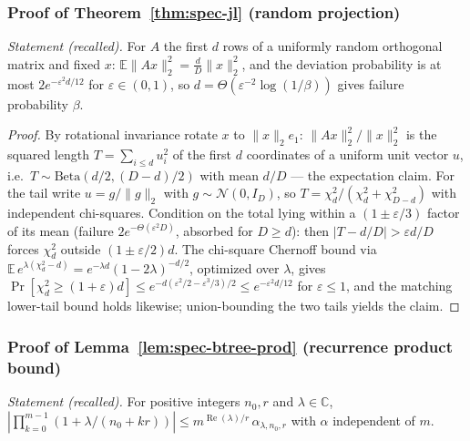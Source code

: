 \subsubsection*{Proof of Theorem~\ref{thm:spec-jl} (random projection)}
{\itshape Statement (recalled).} For $A$ the first $d$ rows of a uniformly
random orthogonal matrix and fixed $x$: $\mathbb{E}\|Ax\|_2^2 =
\frac{d}{D}\|x\|_2^2$, and the deviation probability is at most
$2e^{-\varepsilon^2 d/12}$ for $\varepsilon \in (0,1)$, so $d =
\Theta(\varepsilon^{-2}\log(1/\beta))$ gives failure probability
$\beta$.\eop

\begin{proof}
By rotational invariance rotate $x$ to $\|x\|_2 e_1$: $\|Ax\|_2^2/\|x\|_2^2$
is the squared length $T = \sum_{i \le d} u_i^2$ of the first $d$
coordinates of a uniform unit vector $u$, i.e.\ $T \sim \mathrm{Beta}(d/2,
(D-d)/2)$ with mean $d/D$ --- the expectation claim. For the tail write $u =
g/\|g\|_2$ with $g \sim \mathcal{N}(0, I_D)$, so $T = \chi^2_d/(\chi^2_d +
\chi^2_{D-d})$ with independent chi-squares. Condition on the total lying
within a $(1 \pm \varepsilon/3)$ factor of its mean (failure
$2e^{-\Theta(\varepsilon^2 D)}$, absorbed for $D \ge d$): then $|T - d/D| >
\varepsilon d/D$ forces $\chi^2_d$ outside $(1 \pm \varepsilon/2)d$. The
chi-square Chernoff bound via $\mathbb{E}\,e^{\lambda(\chi^2_d - d)} =
e^{-\lambda d}(1-2\lambda)^{-d/2}$, optimized over $\lambda$, gives
$\Pr[\chi^2_d \ge (1+\varepsilon)d] \le e^{-d(\varepsilon^2/2 -
\varepsilon^3/3)/2} \le e^{-\varepsilon^2 d/12}$ for $\varepsilon \le 1$,
and the matching lower-tail bound holds likewise; union-bounding the two
tails yields the claim.
\end{proof}

\subsubsection*{Proof of Lemma~\ref{lem:spec-btree-prod} (recurrence product bound)}
{\itshape Statement (recalled).} For positive integers $n_0, r$ and
$\lambda \in \mathbb{C}$, $|\prod_{k=0}^{m-1} (1 + \lambda/(n_0 + kr))| \le
m^{\operatorname{Re}(\lambda)/r}\,\alpha_{\lambda, n_0, r}$ with $\alpha$
independent of $m$.\eop

